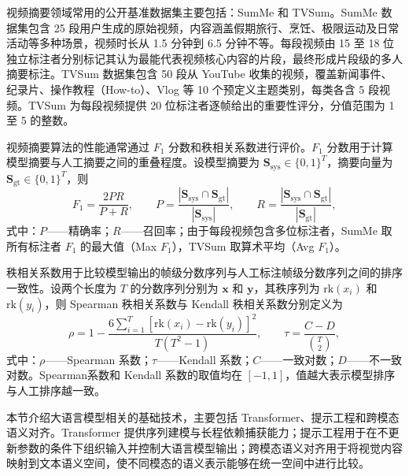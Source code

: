 视频摘要领域常用的公开基准数据集主要包括：SumMe\cite{gygli2014creating} 和 TVSum\cite{song2015tvsum}。SumMe 数据集包含 25 段用户生成的原始视频，内容涵盖假期旅行、烹饪、极限运动及日常活动等多种场景，视频时长从 1.5 分钟到 6.5 分钟不等。每段视频由 15 至 18 位独立标注者分别标记其认为最能代表视频核心内容的片段，最终形成片段级的多人摘要标注。TVSum 数据集包含 50 段从 YouTube 收集的视频，覆盖新闻事件、纪录片、操作教程（How-to）、Vlog 等 10 个预定义主题类别，每类各含 5 段视频。TVSum 为每段视频提供 20 位标注者逐帧给出的重要性评分，分值范围为 1 至 5 的整数。

视频摘要算法的性能通常通过 $F_1$ 分数和秩相关系数进行评价。$F_1$ 分数用于计算模型摘要与人工摘要之间的重叠程度。设模型摘要为 $\mathbf{S}_{\mathrm{sys}}\in\{0,1\}^T$，摘要向量为 $\mathbf{S}_{\mathrm{gt}}\in\{0,1\}^T$，则
\begin{equation}
  F_1 = \frac{2PR}{P + R}, \qquad P = \frac{|\mathbf{S}_{\mathrm{sys}}\cap \mathbf{S}_{\mathrm{gt}}|}{|\mathbf{S}_{\mathrm{sys}}|}, \qquad R = \frac{|\mathbf{S}_{\mathrm{sys}}\cap \mathbf{S}_{\mathrm{gt}}|}{|\mathbf{S}_{\mathrm{gt}}|},
\end{equation}
式中：$P$——精确率；$R$——召回率；由于每段视频包含多位标注者，SumMe 取所有标注者 $F_1$ 的最大值（Max $F_1$），TVSum 取算术平均（Avg $F_1$）。

秩相关系数用于比较模型输出的帧级分数序列与人工标注帧级分数序列之间的排序一致性。设两个长度为 $T$ 的分数序列分别为 $\mathbf{x}$ 和 $\mathbf{y}$，其秩序列为 $\mathrm{rk}(x_i)$ 和 $\mathrm{rk}(y_i)$，则 Spearman 秩相关系数与 Kendall 秩相关系数分别定义为
\begin{equation}
  \rho = 1 - \frac{6\sum_{i=1}^{T}[\mathrm{rk}(x_i)-\mathrm{rk}(y_i)]^{2}}{T(T^{2}-1)}, \qquad \tau = \frac{C - D}{\binom{T}{2}},
\end{equation}
式中：$\rho$——Spearman 系数；$\tau$——Kendall 系数；$C$——一致对数；$D$——不一致对数。Spearman系数和 Kendall 系数的取值均在 $[-1,1]$，值越大表示模型排序与人工排序越一致。

\label{sec:llm_tech}

本节介绍大语言模型相关的基础技术，主要包括 Transformer、提示工程和跨模态语义对齐。Transformer 提供序列建模与长程依赖捕获能力；提示工程用于在不更新参数的条件下组织输入并控制大语言模型输出；跨模态语义对齐用于将视觉内容映射到文本语义空间，使不同模态的语义表示能够在统一空间中进行比较。


